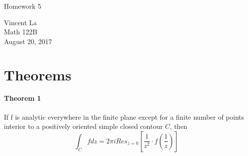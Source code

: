 \documentclass[11pt]{article}
\title{ }
\begin{document}
	\begin{center}	%
		\Large{Homework 5}	%
	\end{center}
	\begin{center}
		Vincent La \\
		Math 122B \\
		August 20, 2017
	\end{center}
	
\section{Theorems}
\paragraph{Theorem 1} If f is analytic everywhere in the finite plane
except for a finite number of points interior to a positively oriented
simple closed contour $C$, then
\[\int_C f dz = 2\pi i Res_{z=0} [\frac{1}{z^2} \cdot f(\frac{1}{z})] \]
	
\end{document}
